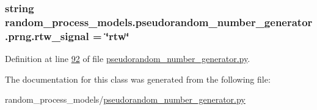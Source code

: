 \subsubsection[{rtw\+\_\+signal}]{\setlength{\rightskip}{0pt plus 5cm}string random\+\_\+process\+\_\+models.\+pseudorandom\+\_\+number\+\_\+generator.\+prng.\+rtw\+\_\+signal = \char`\"{}rtw\char`\"{}\hspace{0.3cm}{\ttfamily [static]}}\label{classrandom__process__models_1_1pseudorandom__number__generator_1_1prng_a6962172d81af8d6c172ba64e33eb0d55}


Definition at line \hyperlink{pseudorandom__number__generator_8py_source_l00092}{92} of file \hyperlink{pseudorandom__number__generator_8py_source}{pseudorandom\+\_\+number\+\_\+generator.\+py}.



The documentation for this class was generated from the following file\+:\begin{DoxyCompactItemize}
\item 
random\+\_\+process\+\_\+models/\hyperlink{pseudorandom__number__generator_8py}{pseudorandom\+\_\+number\+\_\+generator.\+py}\end{DoxyCompactItemize}
